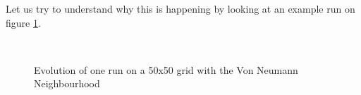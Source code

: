 \documentclass[a4paper]{article}
\begin{document}
Let us try to understand why this is happening by looking at an example run
on figure \ref{vnviz}.

\begin{figure}[H]
	\centering
	\\
	\caption{Evolution of one run on a 50x50 grid with the Von Neumann
	Neighbourhood}
	\label{vnviz}
\end{figure}
\end{document}
